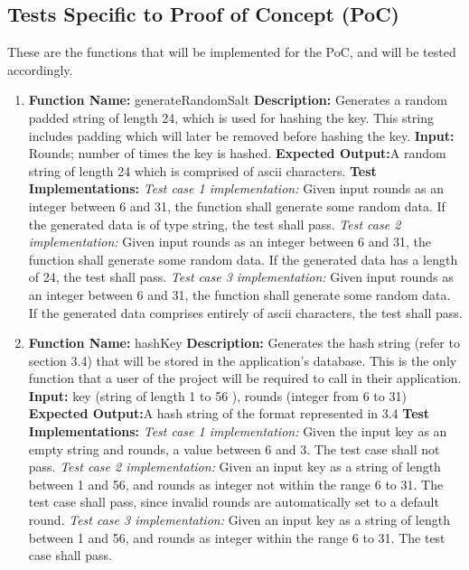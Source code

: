 \documentclass[12pt]{article}
\begin{document}
\subsection{Tests Specific to Proof of Concept (PoC)}
These are the functions that will be implemented for the PoC, and will be tested accordingly.
  \begin{enumerate}
  \item
  \textbf{Function Name:} generateRandomSalt \newline
  \textbf{Description:} Generates a random padded string of length 24, which is used for hashing the key. This string includes padding which will later be removed before hashing the key.\newline
  \textbf{Input:} Rounds; number of times the key is hashed.\newline
  \textbf{Expected Output:}A random string of length 24 which is comprised of ascii characters.\newline
  \textbf{Test Implementations:} \newline
  \textit{Test case 1 implementation:} Given input rounds as an integer between 6 and 31, the function shall generate some random data. If the generated data is of type string, the test shall pass. \newline
  \textit{Test case 2 implementation:} Given input rounds as an integer between 6 and 31, the function shall generate some random data. If the generated data has a length of 24, the test shall pass. \newline
  \textit{Test case 3 implementation:} Given input rounds as an integer between 6 and 31, the function shall generate some random data. If the generated data comprises entirely of ascii characters, the test shall pass. \newline
  \item
  \textbf{Function Name:} hashKey \newline
  \textbf{Description:} Generates the hash string (refer to section 3.4)  that will be stored in the application’s database. This is the only function that a user of the project will be required to call in their application. \newline
  \textbf{Input:} key (string of length 1 to 56 ), rounds (integer from 6 to 31) \newline
  \textbf{Expected Output:}A hash string of the format represented in 3.4 \newline
  \textbf{Test Implementations:} \newline
  \textit{Test case 1 implementation:} Given the input  key as an empty string and rounds, a value between 6 and 3. The test case shall not pass. \newline
  \textit{Test case 2 implementation:} Given an input key as a string of length between 1 and 56, and rounds as integer not within the range 6 to 31. The test case shall pass, since invalid rounds are automatically set to a default round. \newline
  \textit{Test case 3 implementation:} Given an input key as a string of length between 1 and 56, and rounds as integer within the range 6 to 31. The test case shall pass. \newline



\end{enumerate}
\end{document}
